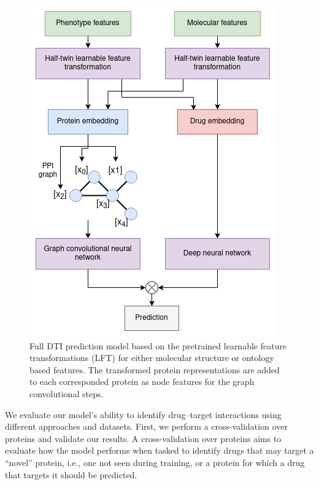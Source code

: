 \documentclass{bioinfo}
\begin{document}
\begin{figure}[!tpb]
	\centering
	\includegraphics[width=0.9\columnwidth]{figures/model_workflow.png}
	\caption{Full DTI prediction model based on the pretrained
          learnable feature transformations (LFT) for either molecular
          structure or ontology based features. The transformed
          protein representations are added to each corresponded
          protein as node features for the graph convolutional
          steps.}
	\label{fig:ModelWorkflow}
\end{figure}


We evaluate our model's ability to identify drug--target interactions
using different approaches and datasets. First, we perform a
cross-validation over proteins and validate our results. A
cross-validation over proteins aims to evaluate how the model performs
when tasked to identify drugs that may target a ``novel'' protein,
i.e., one not seen during training, or a protein for which a drug that
targets it should be predicted. 
\end{document}
